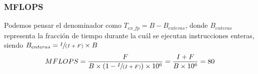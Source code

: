\documentclass{beamer}
\begin{document}
\begin{frame}
\frametitle{MFLOPS}
Podemos pensar el denominador como $T_{ex\_fp} = B - B_{enteras}$, donde $B_{enteras}$ representa la fracción 
de tiempo durante la cuál se ejecutan instrucciones enteras, siendo $B_{enteras} = \sfrac{I}{(I+F)} \times B $
%
\medskip
\begin{displaymath}
MFLOPS = \frac{F}{B \times (1 - \sfrac{I}{(I + F)}) \times 10^6} = \frac {I + F}{B \times 10^6}  = 80
\end{displaymath}
\end{frame}
%
\end{document}
